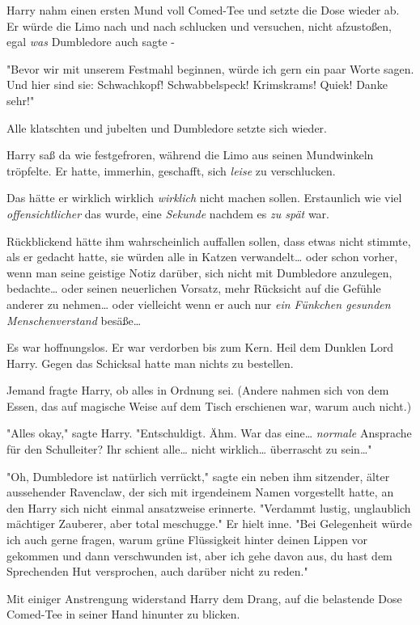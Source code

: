 {Harry nahm einen ersten Mund voll Comed-Tee und setzte die Dose wieder ab. Er würde die Limo nach und nach schlucken und versuchen, nicht afzustoßen, egal \emph{was} Dumbledore auch sagte -

"Bevor wir mit unserem Festmahl beginnen, würde ich gern ein paar Worte sagen. Und hier sind sie: Schwachkopf! Schwabbelspeck! Krimskrams! Quiek! Danke sehr!"

Alle klatschten und jubelten und Dumbledore setzte sich wieder.

Harry saß da wie festgefroren, während die Limo aus seinen Mundwinkeln tröpfelte. Er hatte, immerhin, geschafft, sich \emph{leise} zu verschlucken.

Das hätte er wirklich wirklich \emph{wirklich} nicht machen sollen. Erstaunlich wie viel \emph{offensichtlicher} das wurde, eine \emph{Sekunde} nachdem es \emph{zu spät} war.

Rückblickend hätte ihm wahrscheinlich auffallen sollen, dass etwas nicht stimmte, als er gedacht hatte, sie würden alle in Katzen verwandelt… oder schon vorher, wenn man seine geistige Notiz darüber, sich nicht mit Dumbledore anzulegen, bedachte… oder seinen neuerlichen Vorsatz, mehr Rücksicht auf die Gefühle anderer zu nehmen… oder vielleicht wenn er auch nur \emph{ein Fünkchen gesunden Menschenverstand} besäße…

Es war hoffnungslos. Er war verdorben bis zum Kern. Heil dem Dunklen Lord Harry. Gegen das Schicksal hatte man nichts zu bestellen.

Jemand fragte Harry, ob alles in Ordnung sei. (Andere nahmen sich von dem Essen, das auf magische Weise auf dem Tisch erschienen war, warum auch nicht.)

"Alles okay," sagte Harry. "Entschuldigt. Ähm. War das eine… \emph{normale} Ansprache für den Schulleiter? Ihr schient alle… nicht wirklich… überrascht zu sein…"

"Oh, Dumbledore ist natürlich verrückt," sagte ein neben ihm sitzender, älter aussehender Ravenclaw, der sich mit irgendeinem Namen vorgestellt hatte, an den Harry sich nicht einmal ansatzweise erinnerte. "Verdammt lustig, unglaublich mächtiger Zauberer, aber total meschugge." Er hielt inne. "Bei Gelegenheit würde ich auch gerne fragen, warum grüne Flüssigkeit hinter deinen Lippen vor gekommen und dann verschwunden ist, aber ich gehe davon aus, du hast dem Sprechenden Hut versprochen, auch darüber nicht zu reden."

Mit einiger Anstrengung widerstand Harry dem Drang, auf die belastende Dose Comed-Tee in seiner Hand hinunter zu blicken.

}

